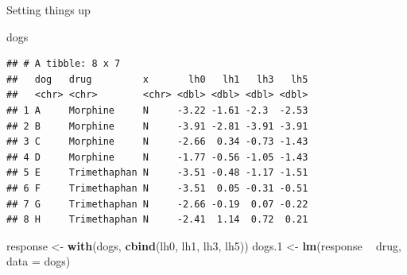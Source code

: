 \documentclass[
  ignorenonframetext,
]{beamer}
\newenvironment{Shaded}{\begin{snugshade}}{\end{snugshade}}
\newcommand{\DataTypeTok}[1]{\textcolor[rgb]{0.13,0.29,0.53}{#1}}
\newcommand{\FloatTok}[1]{\textcolor[rgb]{0.00,0.00,0.81}{#1}}
\newcommand{\KeywordTok}[1]{\textcolor[rgb]{0.13,0.29,0.53}{\textbf{#1}}}
\newcommand{\NormalTok}[1]{#1}
\newcommand{\OperatorTok}[1]{\textcolor[rgb]{0.81,0.36,0.00}{\textbf{#1}}}
\newcommand{\StringTok}[1]{\textcolor[rgb]{0.31,0.60,0.02}{#1}}
\begin{document}
\begin{frame}[fragile]{Setting things up}
\protect\hypertarget{setting-things-up}{}

\begin{Shaded}
\begin{Highlighting}[]
\NormalTok{dogs}
\end{Highlighting}
\end{Shaded}

\begin{verbatim}
## # A tibble: 8 x 7
##   dog   drug         x       lh0   lh1   lh3   lh5
##   <chr> <chr>        <chr> <dbl> <dbl> <dbl> <dbl>
## 1 A     Morphine     N     -3.22 -1.61 -2.3  -2.53
## 2 B     Morphine     N     -3.91 -2.81 -3.91 -3.91
## 3 C     Morphine     N     -2.66  0.34 -0.73 -1.43
## 4 D     Morphine     N     -1.77 -0.56 -1.05 -1.43
## 5 E     Trimethaphan N     -3.51 -0.48 -1.17 -1.51
## 6 F     Trimethaphan N     -3.51  0.05 -0.31 -0.51
## 7 G     Trimethaphan N     -2.66 -0.19  0.07 -0.22
## 8 H     Trimethaphan N     -2.41  1.14  0.72  0.21
\end{verbatim}

\begin{Shaded}
\begin{Highlighting}[]
\NormalTok{response <-}\StringTok{ }\KeywordTok{with}\NormalTok{(dogs, }\KeywordTok{cbind}\NormalTok{(lh0, lh1, lh3, lh5))}
\NormalTok{dogs}\FloatTok{.1}\NormalTok{ <-}\StringTok{ }\KeywordTok{lm}\NormalTok{(response }\OperatorTok{~}\StringTok{ }\NormalTok{drug, }\DataTypeTok{data =}\NormalTok{ dogs)}
\end{Highlighting}
\end{Shaded}

\end{frame}
\end{document}
